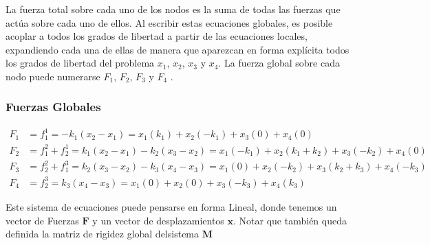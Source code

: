 
La fuerza total sobre cada uno de los nodos es la suma de todas las fuerzas que actúa sobre cada
uno de ellos. Al escribir estas ecuaciones globales, es posible acoplar a todos los grados de
libertad a partir de las ecuaciones locales, expandiendo cada una de ellas de manera que
aparezcan en forma explícita todos los grados de libertad del problema $x_1$, $x_2$, $x_3$ y
$x_4$. La fuerza global sobre cada nodo puede numerarse $F_1$, $F_2$, $F_3$ y $F_4$ .

\mode*

\begin{frame}[label=FrameFuerzasGlobales]
  \frametitle<presentation>{Fuerzas Globales}

  \begin{figure}
  \end{figure}
%
 \tiny 
  \begin{equation}
    \begin{aligned}
      F_1 &= f_1^1  = -k_1( x_2-x_1) =
                   x_1 (k_1) + x_2(-k_1)+ x_3(0) + x_4(0)\\
      F_2 &= f_1^2 + f_2^1 = k_1( x_2-x_1) -k_2(x_3 - x_2) = 
                   x_1 (-k_1) + x_2(k_1+k_2)+ x_3(-k_2) + x_4(0)\\
      F_3 &= f_2^2 + f_1^3 = k_2( x_3-x_2) - k_3 (x_4 - x_3) = 
                    x_1 (0) + x_2(-k_2)+ x_3(k_2 + k_3) + x_4(-k_3)\\
      F_4 &= f_2^3 = k_3( x_4-x_3)=
                     x_1 (0) + x_2(0)+ x_3(-k_3) + x_4(k_3)
    \end{aligned}
  \end{equation}
%
\end{frame}


Este sistema de ecuaciones puede pensarse en forma Lineal, donde tenemos un
vector de Fuerzas $\mathbf{F}$  y un vector de desplazamientos $\mathbf{x}$. Notar que también
queda definida la matriz de rigidez global delsistema $\mathbf{M}$

\mode*

